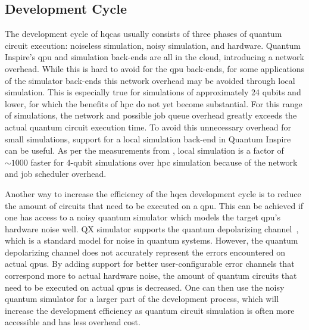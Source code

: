 \subsection{Development Cycle}
The development cycle of \glspl{hqca} usually consists of three phases of quantum circuit execution: noiseless simulation, noisy simulation, and hardware.
Quantum Inspire's \gls{qpu} and simulation back-ends are all in the cloud, introducing a network overhead.
While this is hard to avoid for the \gls{qpu} back-ends, for some applications of the simulator back-ends this network overhead may be avoided through local simulation.
This is especially true for simulations of approximately 24 qubits and lower, for which the benefits of \gls{hpc} do not yet become substantial.
For this range of simulations, the network and possible job queue overhead greatly exceeds the actual quantum circuit execution time.
To avoid this unnecessary overhead for small simulations, support for a local simulation back-end in Quantum Inspire can be useful.
As per the measurements from , local simulation is a factor of $\sim1000$ faster for 4-qubit simulations over \gls{hpc} simulation because of the network and job scheduler overhead.

Another way to increase the efficiency of the \gls{hqca} development cycle is to reduce the amount of circuits that need to be executed on a \gls{qpu}.
This can be achieved if one has access to a noisy quantum simulator which models the target \gls{qpu}'s hardware noise well.
QX simulator supports the quantum depolarizing channel~\cite[Section 8.3.4]{nielsen2002quantum}, which is a standard model for noise in quantum systems.
However, the quantum depolarizing channel does not accurately represent the errors encountered on actual \glspl{qpu}.
By adding support for better user-configurable error channels that correspond more to actual hardware noise, the amount of quantum circuits that need to be executed on actual \glspl{qpu} is decreased.
One can then use the noisy quantum simulator for a larger part of the development process, which will increase the development efficiency as quantum circuit simulation is often more accessible and has less overhead cost.


